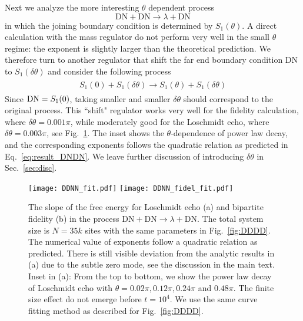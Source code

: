 Next we analyze the more interesting $\theta$ dependent process
\begin{equation}
  \text{DN}+\text{DN}\rightarrow\lambda+\text{DN}
\end{equation}
in which the joining boundary condition is determined by $S_1(\theta)$. A direct calculation with the mass regulator do not perform very well in the small $\theta$ regime: the exponent is slightly larger than the theoretical prediction. We therefore turn to another regulator that shift the far end boundary condition DN to $S_1( \delta \theta )$ and consider the following process
\begin{eqnarray}\begin{aligned}
\label{eq:approx_DNDN}
S_1(0)+S_1(\delta\theta)\rightarrow S_1(\theta)+S_1(\delta\theta)
\end{aligned}\end{eqnarray}
Since ${\rm DN} = S_1 (0 )$, taking smaller and smaller $\delta \theta$ should correspond to the original process. This ``shift" regulator works very well for the fidelity calculation, where $\delta \theta = 0.001 \pi$, while moderately good for the Loschmidt echo, where $\delta \theta = 0.003\pi$, see Fig.~\ref{fig:DDNN}. The inset shows the $\theta$-dependence of power law decay, and the corresponding exponents follows the quadratic relation as predicted in Eq.~\eqref{eq:result_DNDN}. We leave further discussion of introducing $\delta\theta$ in Sec.~\ref{sec:disc}. 

\begin{figure}
  \centering
\texttt{[image: DDNN\_fit.pdf]}
\texttt{[image: DDNN\_fidel\_fit.pdf]}
    \caption{The slope of the free energy for Loschmidt echo (a) and bipartite fidelity (b) in the process $\text{DN}+\text{DN}\rightarrow\lambda+\text{DN}$. The total system size is $N=35k$ sites with the same parameters in Fig.~\ref{fig:DDDD}. The numerical value of exponents follow a quadratic relation as predicted. There is still visible deviation from the analytic results in (a) due to the subtle zero mode, see the discussion in the main text. Inset in (a): From the top to bottom, we show the power law decay of Loschmidt echo with $\theta=0.02\pi, 0.12\pi, 0.24\pi$ and $0.48\pi$. The finite size effect do not emerge before $t=10^{4}$. We use the same curve fitting method as described for Fig.~\ref{fig:DDDD}.}
      \label{fig:DDNN}
\end{figure}

